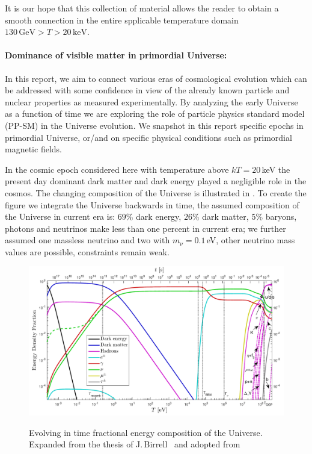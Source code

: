 It is our hope that this collection of material allows the reader to obtain a smooth connection in the entire spplicable temperature domain $130\,\mathrm{GeV}>T>20\,\mathrm{keV}$.

\paragraph{Dominance of visible matter in primordial Universe:}
In this report, we aim to connect various eras of cosmological evolution which can be addressed with some confidence in view of the already known particle and nuclear properties as measured experimentally. By analyzing the early Universe as a function of time we are exploring the role of particle physics standard model (PP-SM) in the Universe evolution. We snapshot in this report specific epochs in primordial Universe, or/and on specific physical conditions such as primordial magnetic fields.

In the cosmic epoch considered here with temperature above $kT=20$\,keV the present day dominant dark matter and dark energy played a negligible role in the cosmos. The changing composition of the Universe is illustrated in . To create the figure we integrate the Universe backwards in time, the assumed composition of the Universe in current era is: $69\%$ dark energy, $26\%$ dark matter, $5\%$ baryons,  photons and neutrinos make less than one percent in current era; we further assumed one  massless neutrino and two with $m_\nu=0.1$\,eV, other neutrino mass values are possible, constraints remain weak.

\begin{figure}
\vspace*{0.62\textwidth}\includegraphics[width=\textwidth]{01-introduction/Figures/energyFractions.pdf}\label{fig:energy_frac}
\caption{Evolving in time  fractional  energy composition of the Universe. Expanded from the thesis of J.\,Birrell~\cite{Birrell:2014ona} and adopted from~\cite{Rafelski:2023emw}}
 \end{figure}

